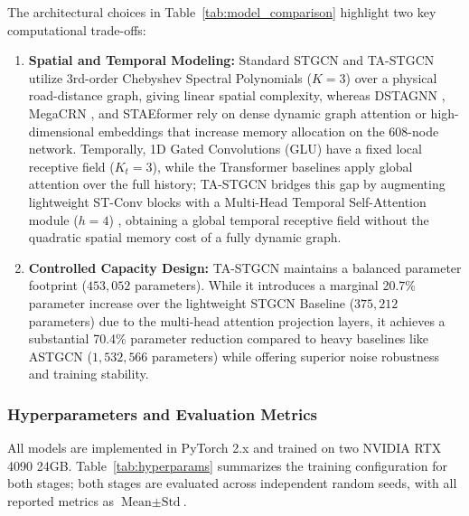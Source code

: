 \documentclass[preprint,12pt]{elsarticle}
\begin{document}
The architectural choices in Table~\ref{tab:model_comparison} highlight two key computational trade-offs:
\begin{enumerate}
    \item \textbf{Spatial and Temporal Modeling:} Standard STGCN \citep{stgcn} and TA-STGCN utilize 3rd-order Chebyshev Spectral Polynomials ($K=3$) \citep{chebnet} over a physical road-distance graph, giving linear spatial complexity, whereas DSTAGNN \citep{dstagnn}, MegaCRN \citep{megacrn}, and STAEformer \citep{staeformer} rely on dense dynamic graph attention or high-dimensional embeddings that increase memory allocation on the 608-node network. Temporally, 1D Gated Convolutions (GLU) \citep{stgcn} have a fixed local receptive field ($K_t=3$), while the Transformer baselines apply global attention over the full history; TA-STGCN bridges this gap by augmenting lightweight ST-Conv blocks with a Multi-Head Temporal Self-Attention module ($h=4$) \citep{attention}, obtaining a global temporal receptive field without the quadratic spatial memory cost of a fully dynamic graph.
    \item \textbf{Controlled Capacity Design:} TA-STGCN maintains a balanced parameter footprint ($453,052$ parameters). While it introduces a marginal 20.7\% parameter increase over the lightweight STGCN Baseline ($375,212$ parameters) due to the multi-head attention projection layers, it achieves a substantial 70.4\% parameter reduction compared to heavy baselines like ASTGCN ($1,532,566$ parameters) while offering superior noise robustness and training stability.
\end{enumerate}


\subsubsection{Hyperparameters and Evaluation Metrics}
All models are implemented in PyTorch 2.x and trained on two NVIDIA RTX 4090 24GB. Table~\ref{tab:hyperparams} summarizes the training configuration for both stages; both stages are evaluated across independent random seeds, with all reported metrics as $\text{Mean} \pm \text{Std}$.
\end{document}
